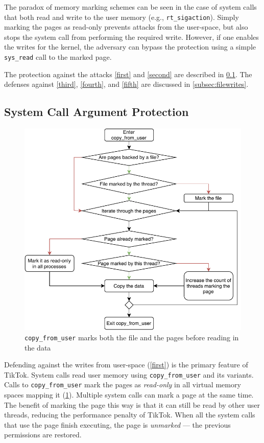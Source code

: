 The paradox of memory marking schemes can be seen in the case of system calls
that both read and write to the user memory (e.g., \texttt{rt\_sigaction}).
Simply marking the pages as read-only prevents attacks from the user-space, but
also stops the system call from performing the required write. However, if one
enables the writes for the kernel, the adversary can bypass the protection
using a simple \texttt{sys\_read} call to the marked page.

The protection against the attacks \ref{first} and \ref{second} are described in
\cref{subsec:memorywrites}. The defenses against \ref{third}, \ref{fourth}, and
\ref{fifth} are discussed in \cref{subsec:filewrites}.


\subsection{System Call Argument Protection}


\label{subsec:memorywrites}
\begin{figure}[]
  \centering
  \includegraphics[width = .45 \textwidth]{img/copy_from_user.pdf}
  \caption{\texttt{copy\_from\_user} marks both the file and the pages before
  reading in the data}
  \label{fig:copyfromuser}
\end{figure}


Defending against the writes from user-space (\cref{first}) is the primary
feature of TikTok. System calls read user memory using \texttt{copy\_from\_user}
and its variants. Calls to \texttt{copy\_from\_user} mark the pages as
\emph{read-only} in all virtual memory spaces mapping it (\cref{fig:copyfromuser}). Multiple system
calls can mark a page at the same time. The benefit of marking the page this way
is that it can still be read by other user threads, reducing the performance
penalty of TikTok. When all the system calls that use the page finish executing,
the page is \emph{unmarked} --- the previous permissions are restored.

